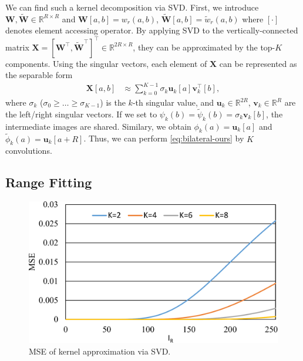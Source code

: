 \documentclass{article}
\begin{document}
We can find such a kernel decomposition via SVD.
First, we introduce $\bm{W},\tilde{\bm{W}}\in\mathbb{R}^{R \times R}$ and $\bm{W}[a,b]=w_r(a,b)$, $\tilde{\bm{W}}[a,b]=\tilde{w}_r(a,b)$ where $[\cdot]$ denotes element accessing operator. By applying SVD to the vertically-connected matrix $\bm{X}=[\bm{W}^\top,\tilde{\bm{W}}^\top]^\top\in\mathbb{R}^{2R \times R}$,
they can be approximated by the top-$K$ components.
Using the singular vectors, each element of $\bm{X}$ can be represented as the separable form
\vspace{-1mm}
\begin{align}
    \bm{X}[a,b] &\approx \sum_{k=0}^{K-1} \sigma_k \bm{u}_k[a] \bm{v}_k^\top[b],
\label{eq:tsvd}
\end{align}
where $\sigma_k$ ($\sigma_0\geq\ldots\geq\sigma_{K-1}$) is the $k$-th singular value,
and $\bm{u}_k\in\mathbb{R}^{2R}$, $\bm{v}_k\in\mathbb{R}^{R}$ are the left/right singular vectors.
If we set to $\psi_k(b)=\tilde{\psi}_k(b)=\sigma_k \bm{v}_k[b]$, the intermediate images are shared. Similary, we obtain $\phi_k(a)=\bm{u}_k[a]$ and $\tilde{\phi}_k(a)=\bm{u}_k[a+R]$.
Thus, we can perform \eqref{eq:bilateral-ours} by $K$ convolutions.

\subsection{Range Fitting}

\begin{figure}[t]
\centering
\includegraphics[width=0.7\columnwidth]{fig/error_EVD_MSE.pdf}
\vspace{-2mm}
\caption{MSE of kernel approximation via SVD.}
\label{f:svdmse}
\end{figure}
\end{document}
